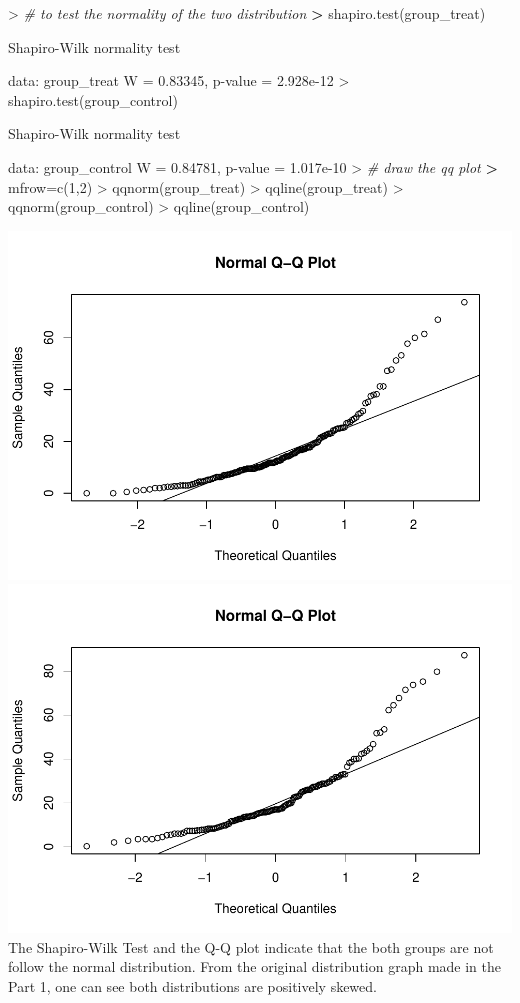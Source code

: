 \documentclass[
]{article}
\newenvironment{Shaded}{\begin{snugshade}}{\end{snugshade}}
\newcommand{\CommentTok}[1]{\textcolor[rgb]{0.56,0.35,0.01}{\textit{#1}}}
\newcommand{\DecValTok}[1]{\textcolor[rgb]{0.00,0.00,0.81}{#1}}
\newcommand{\ErrorTok}[1]{\textcolor[rgb]{0.64,0.00,0.00}{\textbf{#1}}}
\newcommand{\FloatTok}[1]{\textcolor[rgb]{0.00,0.00,0.81}{#1}}
\newcommand{\FunctionTok}[1]{\textcolor[rgb]{0.00,0.00,0.00}{#1}}
\newcommand{\NormalTok}[1]{#1}
\newcommand{\OtherTok}[1]{\textcolor[rgb]{0.56,0.35,0.01}{#1}}
\newcommand{\SpecialCharTok}[1]{\textcolor[rgb]{0.00,0.00,0.00}{#1}}
\begin{document}
\begin{Shaded}
\begin{Highlighting}[]
\SpecialCharTok{\textgreater{}} \CommentTok{\# to test the normality of the two distribution}
\ErrorTok{\textgreater{}} \FunctionTok{shapiro.test}\NormalTok{(group\_treat)}

\NormalTok{    Shapiro}\SpecialCharTok{{-}}\NormalTok{Wilk normality test}

\NormalTok{data}\SpecialCharTok{:}\NormalTok{  group\_treat}
\NormalTok{W }\OtherTok{=} \FloatTok{0.83345}\NormalTok{, p}\SpecialCharTok{{-}}\NormalTok{value }\OtherTok{=} \FloatTok{2.928e{-}12}
\SpecialCharTok{\textgreater{}} \FunctionTok{shapiro.test}\NormalTok{(group\_control)}

\NormalTok{    Shapiro}\SpecialCharTok{{-}}\NormalTok{Wilk normality test}

\NormalTok{data}\SpecialCharTok{:}\NormalTok{  group\_control}
\NormalTok{W }\OtherTok{=} \FloatTok{0.84781}\NormalTok{, p}\SpecialCharTok{{-}}\NormalTok{value }\OtherTok{=} \FloatTok{1.017e{-}10}
\SpecialCharTok{\textgreater{}} \CommentTok{\# draw the qq plot}
\ErrorTok{\textgreater{}}\NormalTok{ mfrow}\OtherTok{=}\FunctionTok{c}\NormalTok{(}\DecValTok{1}\NormalTok{,}\DecValTok{2}\NormalTok{)}
\SpecialCharTok{\textgreater{}} \FunctionTok{qqnorm}\NormalTok{(group\_treat)}
\SpecialCharTok{\textgreater{}} \FunctionTok{qqline}\NormalTok{(group\_treat)}
\SpecialCharTok{\textgreater{}} \FunctionTok{qqnorm}\NormalTok{(group\_control)}
\SpecialCharTok{\textgreater{}} \FunctionTok{qqline}\NormalTok{(group\_control)}
\end{Highlighting}
\end{Shaded}

\includegraphics[width=0.5\linewidth,height=0.5\textheight]{Homework_07_new_Pan_files/figure-latex/unnamed-chunk-5-1}
\includegraphics[width=0.5\linewidth,height=0.5\textheight]{Homework_07_new_Pan_files/figure-latex/unnamed-chunk-5-2}
The Shapiro-Wilk Test and the Q-Q plot indicate that the both groups are
not follow the normal distribution. From the original distribution graph
made in the Part 1, one can see both distributions are positively
skewed.
\end{document}
